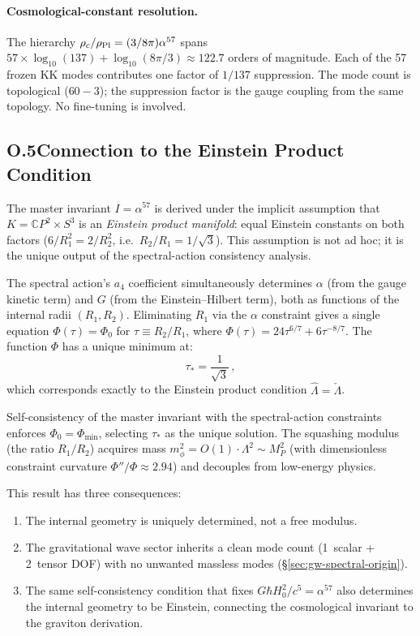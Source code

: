\paragraph{Cosmological-constant resolution.}
The hierarchy $\rho_c/\rho_{\rm Pl} = (3/8\pi)\alpha^{57}$ spans
$57 \times \log_{10}(137) + \log_{10}(8\pi/3) \approx 122.7$ orders of magnitude.
Each of the 57 frozen KK modes contributes one factor of $1/137$ suppression.
The mode count is topological ($60 - 3$); the suppression factor is the gauge coupling
from the same topology.  No fine-tuning is involved.

\subsection{O.5\quad Connection to the Einstein Product Condition}\label{sec:O-einstein-product}

The master invariant $I = \alpha^{57}$ is derived under the implicit assumption
that $K = \mathbb{C}P^2 \times S^3$ is an \emph{Einstein product manifold}:
equal Einstein constants on both factors ($6/R_1^2 = 2/R_2^2$, i.e.\
$R_2/R_1 = 1/\sqrt{3}$).  This assumption is not ad hoc; it is the unique
output of the spectral-action consistency analysis.

The spectral action's $a_4$ coefficient simultaneously determines $\alpha$
(from the gauge kinetic term) and $G$ (from the Einstein--Hilbert term), both
as functions of the internal radii $(R_1, R_2)$.  Eliminating $R_1$ via the
$\alpha$ constraint gives a single equation $\Phi(\tau) = \Phi_0$ for
$\tau \equiv R_2/R_1$, where $\Phi(\tau) = 24\tau^{6/7} + 6\tau^{-8/7}$.
The function $\Phi$ has a unique minimum at:
\begin{equation}\label{eq:O-tau-star}
\tau_* = \frac{1}{\sqrt{3}}\,,
\end{equation}
which corresponds exactly to the Einstein product condition
$\hat\Lambda = \check\Lambda$.

Self-consistency of the master invariant with the spectral-action constraints
enforces $\Phi_0 = \Phi_{\min}$, selecting $\tau_*$ as the unique solution.
The squashing modulus (the ratio $R_1/R_2$) acquires mass
$m_\phi^2 = O(1)\cdot\Lambda^2 \sim M_P^2$ (with dimensionless constraint
curvature $\Phi''/\Phi \approx 2.94$) and decouples from low-energy physics.

This result has three consequences:
\begin{enumerate}
\item The internal geometry is uniquely determined, not a free modulus.
\item The gravitational wave sector inherits a clean mode count (1~scalar
  + 2~tensor DOF) with no unwanted massless modes (\S\ref{sec:gw-spectral-origin}).
\item The same self-consistency condition that fixes $G\hbar H_0^2/c^5 = \alpha^{57}$
  also determines the internal geometry to be Einstein, connecting the cosmological
  invariant to the graviton derivation.
\end{enumerate}
